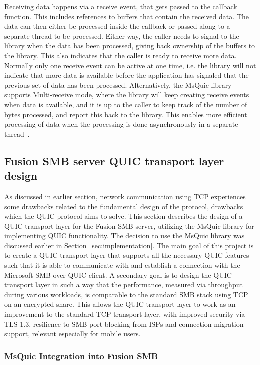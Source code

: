 \documentclass[english, 12pt, a4paper, elec, utf8, a-2b, online]{aaltothesis}
\begin{document}
Receiving data happens via a receive event, that gets passed to the callback function.
This includes references to buffers that contain the received data. The data can
then either be processed inside the callback or passed along to a separate
thread to be processed. Either way, the caller needs to signal to the library when
the data has been processed, giving back ownership of the buffers to the library. This
also indicates that the caller is ready to receive more data. Normally only one receive
event can be active at one time, i.e. the library will not indicate that more data is
available before the application has signaled that the previous set of data has been processed.
Alternatively, the MsQuic library supports Multi-receive mode,
where the library will keep creating receive events when data is available, and
it is up to the caller to keep track of the number of bytes processed, and report
this back to the library. This enables more efficient processing of data when the
processing is done asynchronously in a separate thread~\cite{msquic_docs}.

\subsection{Fusion SMB server QUIC transport layer design}

As discussed in earlier section, network communication using TCP experiences
some drawbacks related to the fundamental design of the protocol, drawbacks
which the QUIC protocol aims to solve. This section describes the design of a
QUIC transport layer for the Fusion SMB server, utilizing the MsQuic library for
implementing QUIC functionality. The decision to use the MsQuic library was discussed
earlier in Section~\ref{sec:implementation}. The main goal of this project is to create
a QUIC transport layer that supports all the necessary QUIC features such that it
is able to communicate with and establish a connection with the Microsoft SMB over
QUIC client. A secondary goal is to design the QUIC transport layer in such a way
that the performance, measured via throughput during various workloads, is comparable
to the standard SMB stack using TCP on an encrypted share. This allows the QUIC transport
layer to work as an improvement to the standard TCP transport layer, with improved
security via TLS 1.3, resilience to SMB port blocking from ISPs and connection migration
support, relevant especially for mobile users.

\subsubsection{MsQuic Integration into Fusion SMB}
\end{document}

